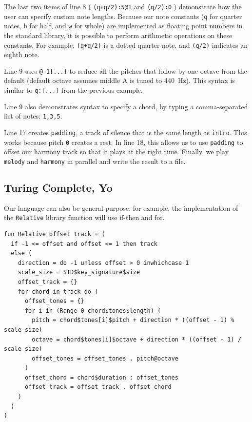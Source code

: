 \documentclass[11pt, onecolumn, letterpaper]{article}
\begin{document}
The last two items of line 8 ( \texttt{(q+q/2):5@1} and \texttt{(q/2):0} ) demonstrate how the user can specify custom note lengths. Because our note constants (\texttt{q} for quarter notes, \texttt{h} for half, and \texttt{w} for whole) are implemented as floating point numbers in the standard library, it is possible to perform arithmetic operations on these constants. For example, \texttt{(q+q/2)} is a dotted quarter note, and \texttt{(q/2)} indicates an eighth note.

Line 9 uses \texttt{@-1[...]} to reduce all the pitches that follow by one octave from the default (default octave assumes middle A is tuned to 440~Hz). This syntax is similar to \texttt{q:[...]} from the previous example. 

Line 9 also demonstrates syntax to specify a chord, by typing a comma-separated list of notes: \texttt{1,3,5}. 

Line 17 creates \texttt{padding}, a track of silence that is the same length as \texttt{intro}. This works because pitch \texttt{0} creates a rest. In line 18, this allows us to use \texttt{padding} to offset our harmony track so that it plays at the right time. Finally, we play \texttt{melody} and \texttt{harmony} in parallel and write the result to a file. 

\newpage
\subsection{Turing Complete, Yo}

Our language can also be general-purpose: for example, the implementation of the \texttt{Relative} library function will use if-then and for. 


\begin{lstlisting}
fun Relative offset track = (
  if -1 <= offset and offset <= 1 then track
  else (
    direction = do -1 unless offset > 0 inwhichcase 1
    scale_size = STD$key_signature$size
    offset_track = {}
    for chord in track do (
      offset_tones = {}
      for i in (Range 0 chord$tones$length) (
        pitch = chord$tones[i]$pitch + direction * ((offset - 1) % scale_size)
        octave = chord$tones[i]$octave + direction * ((offset - 1) / scale_size)
        offset_tones = offset_tones . pitch@octave
      )
      offset_chord = chord$duration : offset_tones
      offset_track = offset_track . offset_chord
    )
  )
)
\end{lstlisting}
\end{document}
